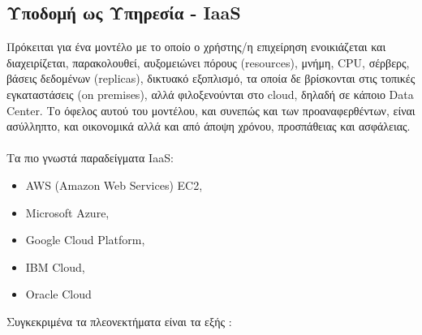 \documentclass{article}
\begin{document}
\subsection{Υποδομή ως Υπηρεσία -
IaaS}
Πρόκειται για ένα μοντέλο με το οποίο ο χρήστης/η επιχείρηση ενοικιάζεται
και διαχειρίζεται, παρακολουθεί, αυξομειώνει πόρους
(resources),
μνήμη, CPU, σέρβερς, βάσεις
δεδομένων (replicas),
δικτυακό εξοπλισμό, τα οποία δε βρίσκονται στις τοπικές εγκαταστάσεις
(on premises), αλλά
φιλοξενούνται στο cloud,
δηλαδή σε κάποιο Data
Center. Το όφελος αυτού του μοντέλου, και συνεπώς
και των προαναφερθέντων, είναι ασύλληπτο, και οικονομικά αλλά και από
άποψη χρόνου, προσπάθειας και ασφάλειας. \\ \\
Τα πιο γνωστά παραδείγματα IaaS:
\begin{itemize}
\item AWS (Amazon Web Services) EC2,
\item Microsoft Azure,
\item Google Cloud Platform,
\item IBM Cloud,
\item Oracle Cloud
\end{itemize}
Συγκεκριμένα τα πλεονεκτήματα είναι τα εξής :
\end{document}
